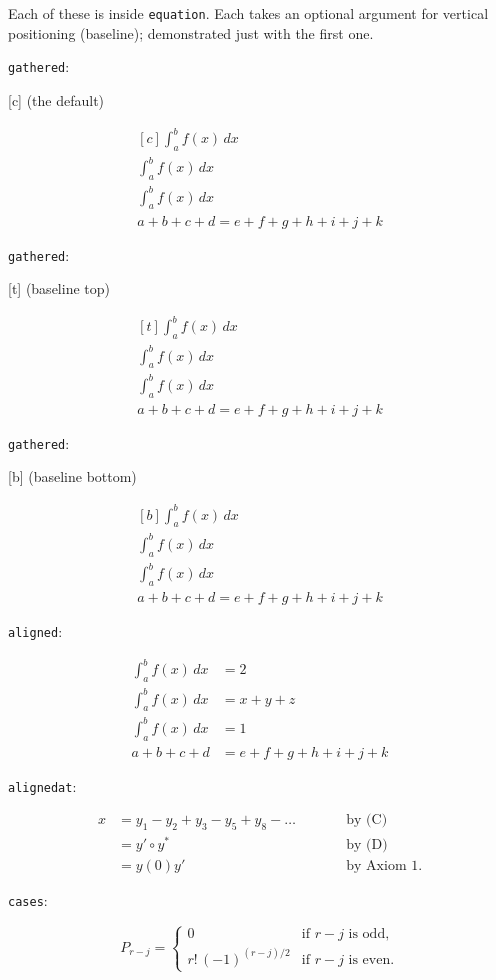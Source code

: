 \documentclass[leqno]{article}
\newcommand{\testtype}[2]{\texttt{#1}:%
  #2}
\newcommand{\makeoutertest}[3]{
  \begin{test}
    \testtype{#1}{#2}
    #3
  \end{test}
}
\begin{document}
Each of these is inside \texttt{equation}.
Each takes an optional argument for vertical positioning (baseline); demonstrated just with the first one.

\makeoutertest{gathered}{
  [c] (the default)
}{
  \begin{equation}
    \begin{gathered}[c]
      \int_a^b f(x)\, dx\\
      \int_a^b f(x)\, dx\\
      \int_a^b f(x)\, dx\\
      a+b+c+d = e+f+g+h+i+j+k
    \end{gathered}
  \end{equation}
}
\makeoutertest{gathered}{
  [t] (baseline top)
}{
  \begin{equation}
    \begin{gathered}[t]
      \int_a^b f(x)\, dx\\
      \int_a^b f(x)\, dx\\
      \int_a^b f(x)\, dx\\
      a+b+c+d = e+f+g+h+i+j+k
    \end{gathered}
  \end{equation}
}
\makeoutertest{gathered}{
  [b] (baseline bottom)
}{
  \begin{equation}
    \begin{gathered}[b]
      \int_a^b f(x)\, dx\\
      \int_a^b f(x)\, dx\\
      \int_a^b f(x)\, dx\\
      a+b+c+d = e+f+g+h+i+j+k
    \end{gathered}
  \end{equation}
}
\makeoutertest{aligned}{
}{
  \begin{equation}
      \begin{aligned}
      \int_a^b f(x)\, dx & = 2 \\
      \int_a^b f(x)\, dx & = x+y+z \\
      \int_a^b f(x)\, dx & = 1\\
      a+b+c+d & = e+f+g+h+i+j+k
      \end{aligned}
  \end{equation}
}
\makeoutertest{alignedat}{
}{
  \begin{equation}
    \begin{alignedat}{2}
      x& = y_1-y_2+y_3-y_5+y_8-\dots
      &\qquad& \text{by (C)}\\
       & = y'\circ y^* && \text{by (D)}\\
       & = y(0) y' && \text {by Axiom 1.}
    \end{alignedat}
  \end{equation}
}
\makeoutertest{cases}{
}{
  \begin{equation*}
    P_{r-j}=
    \begin{cases}
      0& \text{if $r-j$ is odd},\\
      r!\,(-1)^{(r-j)/2}& \text{if $r-j$ is even}.
    \end{cases}
  \end{equation*}
}
\end{document}
